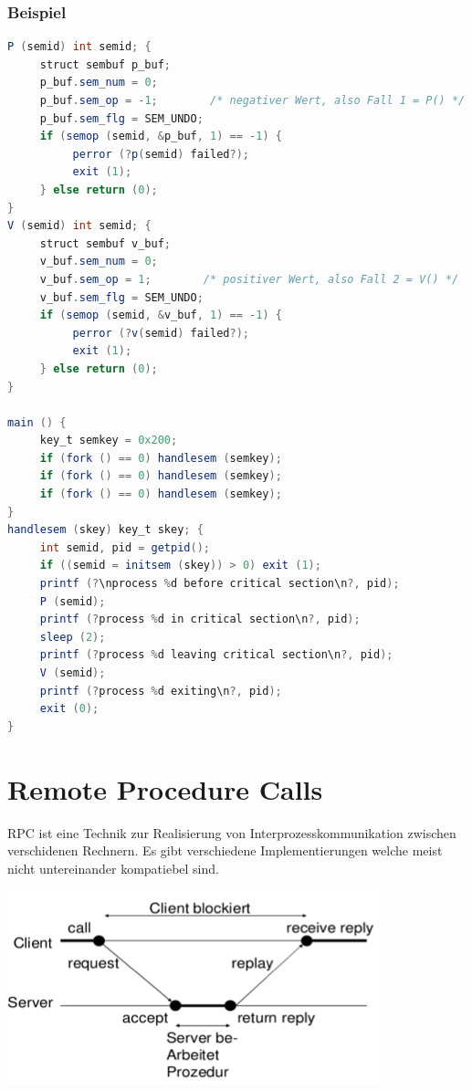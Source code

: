 \documentclass[10pt]{article}
\begin{document}
\subsubsection{Beispiel}
\begin{lstlisting}[language=Java, caption=Semaphore Beispiel, style=JavaStyle]
P (semid) int semid; {
     struct sembuf p_buf;
     p_buf.sem_num = 0;
     p_buf.sem_op = -1;        /* negativer Wert, also Fall 1 = P() */
     p_buf.sem_flg = SEM_UNDO;
     if (semop (semid, &p_buf, 1) == -1) {
          perror (?p(semid) failed?);
          exit (1);
     } else return (0);
}
V (semid) int semid; {
     struct sembuf v_buf;
     v_buf.sem_num = 0;
     v_buf.sem_op = 1;        /* positiver Wert, also Fall 2 = V() */
     v_buf.sem_flg = SEM_UNDO;
     if (semop (semid, &v_buf, 1) == -1) {
          perror (?v(semid) failed?);
          exit (1);
     } else return (0);
}

main () {
     key_t semkey = 0x200;
     if (fork () == 0) handlesem (semkey);
     if (fork () == 0) handlesem (semkey);
     if (fork () == 0) handlesem (semkey);
}
handlesem (skey) key_t skey; {
     int semid, pid = getpid();
     if ((semid = initsem (skey)) > 0) exit (1);
     printf (?\nprocess %d before critical section\n?, pid); 
     P (semid);
     printf (?process %d in critical section\n?, pid);
     sleep (2);
     printf (?process %d leaving critical section\n?, pid); 
     V (semid);
     printf (?process %d exiting\n?, pid);
     exit (0);
}
\end{lstlisting}

\newpage
\section{Remote Procedure Calls}
RPC ist eine Technik zur Realisierung von Interprozesskommunikation zwischen verschidenen Rechnern. Es gibt verschiedene Implementierungen welche meist nicht untereinander kompatiebel sind.
\begin{center}
	\includegraphics[scale=0.5]{rpc.png}\\
\end{center}
\end{document}
